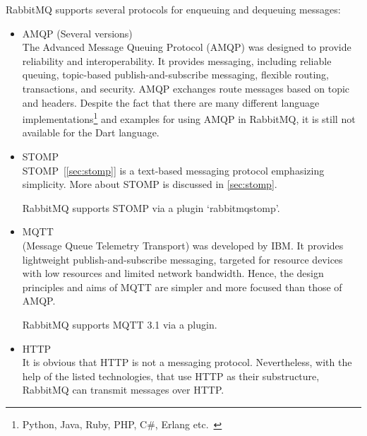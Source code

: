 RabbitMQ supports several protocols for enqueuing and dequeuing messages:
\begin{itemize}
  \item AMQP (Several versions)\\
  The Advanced Message Queuing Protocol (AMQP) was designed to provide reliability and interoperability. It provides messaging, including reliable queuing, topic-based publish-and-subscribe messaging, flexible routing, transactions, and security. AMQP exchanges route messages based on topic and headers.\cite{andyPiperVmware}
  Despite the fact that there are many different language implementations\footnote{Python, Java, Ruby, PHP, C\#, Erlang etc.~\cite{rabbitmqGetstarted}} and examples for using AMQP in RabbitMQ, it is still not available for the Dart language.

  \item STOMP\\
  STOMP~[\autoref{sec:stomp}] is a text-based messaging protocol emphasizing simplicity. More about STOMP is discussed in \autoref{sec:stomp}.

  RabbitMQ supports STOMP via a plugin \textendash{} ‘rabbitmq\textunderscore{}stomp’.

  \item MQTT\\
  (Message Queue Telemetry Transport) was developed by IBM. It provides lightweight publish-and-subscribe messaging, targeted for resource devices with low resources and limited network bandwidth. Hence, the design principles and aims of MQTT are simpler and more focused than those of AMQP.~\cite{andyPiperVmware}

  RabbitMQ supports MQTT 3.1 via a plugin.
  \item HTTP\\
  It is obvious that HTTP is not a messaging protocol. Nevertheless, with the help of the listed technologies, that use HTTP as their substructure, RabbitMQ can transmit messages over HTTP. ~\cite{rabbitmqProtocols}

\end{itemize}

